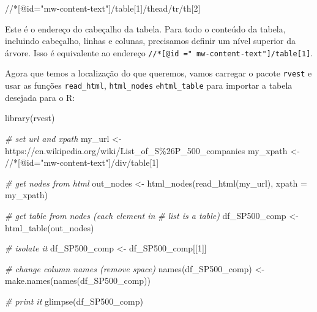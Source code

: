 \documentclass[
  11pt,
]{book}
\newenvironment{Shaded}{\begin{snugshade}}{\end{snugshade}}
\newcommand{\AttributeTok}[1]{\textcolor[rgb]{0.61,0.61,0.61}{#1}}
\newcommand{\CommentTok}[1]{\textcolor[rgb]{0.37,0.37,0.37}{\textit{#1}}}
\newcommand{\DecValTok}[1]{\textcolor[rgb]{0.06,0.06,0.06}{#1}}
\newcommand{\FunctionTok}[1]{\textcolor[rgb]{0,0,0}{#1}}
\newcommand{\NormalTok}[1]{#1}
\newcommand{\OtherTok}[1]{\textcolor[rgb]{0.37,0.37,0.37}{#1}}
\newcommand{\StringTok}[1]{\textcolor[rgb]{0.5,0.5,0.5}{#1}}
\begin{document}
\begin{Shaded}
\begin{Highlighting}[]
\StringTok{\textquotesingle{}//*[@id="mw{-}content{-}text"]/table[1]/thead/tr/th[2]\textquotesingle{}}
\end{Highlighting}
\end{Shaded}

Este é o endereço do cabeçalho da tabela. Para todo o conteúdo da tabela, incluindo cabeçalho, linhas e colunas, precisamos definir um nível superior da árvore. Isso é equivalente ao endereço \texttt{//*{[}@id\ ="\ mw-content-text"{]}/table{[}1{]}}.

Agora que temos a localização do que queremos, vamos carregar o pacote \texttt{rvest} \citep{R-rvest} e usar as funções \texttt{read\_html}, \texttt{html\_nodes} e\texttt{html\_table} para importar a tabela desejada para o R:    

\begin{Shaded}
\begin{Highlighting}[]
\FunctionTok{library}\NormalTok{(rvest)}

\CommentTok{\# set url and xpath}
\NormalTok{my\_url }\OtherTok{\textless{}{-}} \StringTok{\textquotesingle{}https://en.wikipedia.org/wiki/List\_of\_S\%26P\_500\_companies\textquotesingle{}}
\NormalTok{my\_xpath }\OtherTok{\textless{}{-}} \StringTok{\textquotesingle{}//*[@id="mw{-}content{-}text"]/div/table[1]\textquotesingle{}}

\CommentTok{\# get nodes from html}
\NormalTok{out\_nodes }\OtherTok{\textless{}{-}} \FunctionTok{html\_nodes}\NormalTok{(}\FunctionTok{read\_html}\NormalTok{(my\_url),}
                        \AttributeTok{xpath =}\NormalTok{ my\_xpath)}

\CommentTok{\# get table from nodes (each element in }
\CommentTok{\# list is a table)}
\NormalTok{df\_SP500\_comp }\OtherTok{\textless{}{-}} \FunctionTok{html\_table}\NormalTok{(out\_nodes)}

\CommentTok{\# isolate it }
\NormalTok{df\_SP500\_comp }\OtherTok{\textless{}{-}}\NormalTok{ df\_SP500\_comp[[}\DecValTok{1}\NormalTok{]]}

\CommentTok{\# change column names (remove space)}
\FunctionTok{names}\NormalTok{(df\_SP500\_comp) }\OtherTok{\textless{}{-}} \FunctionTok{make.names}\NormalTok{(}\FunctionTok{names}\NormalTok{(df\_SP500\_comp))}

\CommentTok{\# print it}
\FunctionTok{glimpse}\NormalTok{(df\_SP500\_comp)}
\end{Highlighting}
\end{Shaded}
\end{document}
